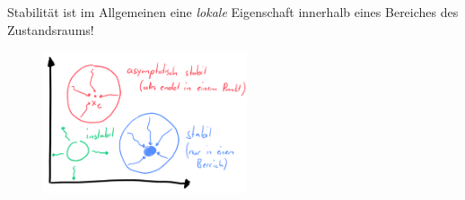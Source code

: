 \documentclass[
  10pt,
  a4paper,
  twocolumn]{article}
\numberwithin{equation}{section}
\begin{document}
Stabilität ist im Allgemeinen eine \emph{lokale} Eigenschaft innerhalb
eines Bereiches des Zustandsraums!

\begin{figure}[H]

{\centering \includegraphics[width=6cm,height=4.2cm]{images/paste-70.png}

}

\end{figure}
\end{document}
